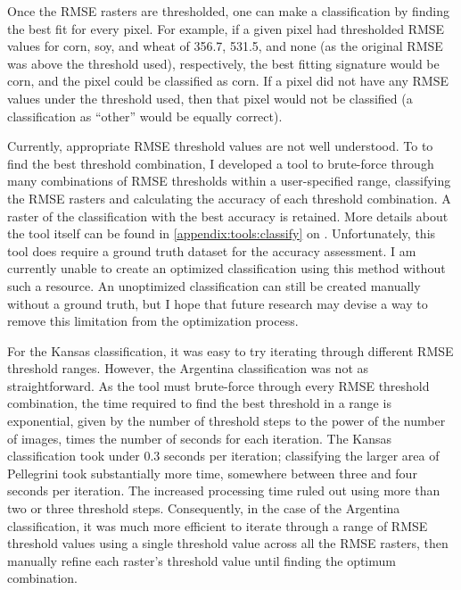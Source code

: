 Once the RMSE rasters are thresholded, one can make a classification by finding the best fit for every pixel. For example, if a given pixel had thresholded RMSE values for corn, soy, and wheat of 356.7, 531.5, and none (as the original RMSE was above the threshold used), respectively, the best fitting signature would be corn, and the pixel could be classified as corn. If a pixel did not have any RMSE values under the threshold used, then that pixel would not be classified (a classification as ``other'' would be equally correct).

Currently, appropriate RMSE threshold values are not well understood. To to find the best threshold combination, I developed a tool to brute-force through many combinations of RMSE thresholds within a user-specified range, classifying the RMSE rasters and calculating the accuracy of each threshold combination. A raster of the classification with the best accuracy is retained. More details about the tool itself can be found in \autoref{appendix:tools:classify} on . Unfortunately, this tool does require a ground truth dataset for the accuracy assessment. I am currently unable to create an optimized classification using this method without such a resource. An unoptimized classification can still be created manually without a ground truth, but I hope that future research may devise a way to remove this limitation from the optimization process.

For the Kansas classification, it was easy to try iterating through different RMSE threshold ranges. However, the Argentina classification was not as straightforward. As the tool must brute-force through every RMSE threshold combination, the time required to find the best threshold in a range is exponential, given by the number of threshold steps to the power of the number of images, times the number of seconds for each iteration. The Kansas classification took under 0.3 seconds per iteration; classifying the larger area of Pellegrini took substantially more time, somewhere between three and four seconds per iteration. The increased processing time ruled out using more than two or three threshold steps. Consequently, in the case of the Argentina classification, it was much more efficient to iterate through a range of RMSE threshold values using a single threshold value across all the RMSE rasters, then manually refine each raster's threshold value until finding the optimum combination.